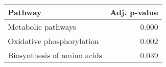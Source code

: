 \begin{tabular}{lr}
\toprule
                     Pathway &  Adj. p-value \\
\midrule
          Metabolic pathways &         0.000 \\
   Oxidative phosphorylation &         0.002 \\
 Biosynthesis of amino acids &         0.039 \\
\bottomrule
\end{tabular}
